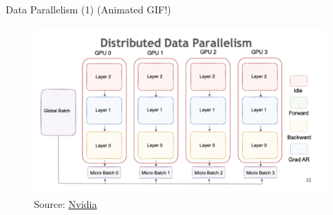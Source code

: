 
\begin{vbframe}{Data Parallelism (1) (Animated GIF!)}

\vfill

\begin{figure}
	\centering
	\includegraphics[width = 11cm]{./figure/data_parallel.png} \\ 
	{\footnotesize Source: \href{https://docs.nvidia.com/nemo-framework/user-guide/latest/nemotoolkit/features/parallelisms.html#distributed-data-parallelism}{Nvidia}}
\end{figure}

\vfill

\end{vbframe}


